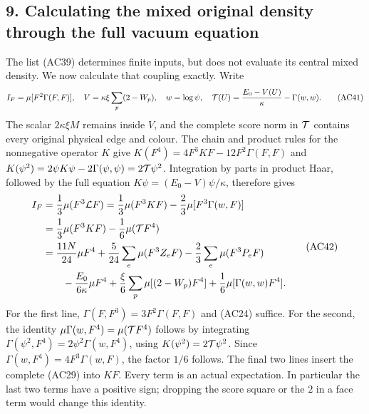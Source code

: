 \documentclass[11pt]{article}
\begin{document}
\subsection*{9. Calculating the mixed original density through the full vacuum equation}

The list (AC39) determines finite inputs, but does not evaluate its central mixed density. We now calculate that coupling exactly. Write
\[
 I_F=\mu[F^2\Gamma(F,F)],\quad
 V=\kappa\xi\sum_p(2-W_p),\quad
 w=\log\psi,\quad
 {\cal T}(U)=\frac{E_0-V(U)}{\kappa}-\Gamma(w,w).
 \tag{AC41}
\]
The scalar \(2\kappa\xi M\) remains inside \(V\), and the complete score norm in \({\cal T}\) contains every original physical edge and colour. The chain and product rules for the nonnegative operator \(K\) give
\(K(F^4)=4F^3KF-12F^2\Gamma(F,F)\) and
\(K(\psi^2)=2\psi K\psi-2\Gamma(\psi,\psi)=2{\cal T}\psi^2\).
Integration by parts in product Haar, followed by the full equation \(K\psi=(E_0-V)\psi/\kappa\), therefore gives
\[
 \begin{aligned}
 I_F
 &=\frac13\mu(F^3{\cal L}F)
  =\frac13\mu(F^3KF)-\frac23\mu[F^3\Gamma(w,F)]\\
 &=\frac13\mu(F^3KF)-\frac16\mu({\cal T}F^4)\\
 &=\frac{11N}{24}\mu F^4
     +\frac5{24}\sum_e\mu(F^3Z_eF)
     -\frac23\sum_e\mu(F^3P_eF)\\
 &\hspace{7mm}
     -\frac{E_0}{6\kappa}\mu F^4
     +\frac{\xi}{6}\sum_p\mu[(2-W_p)F^4]
     +\frac16\mu[\Gamma(w,w)F^4].
 \end{aligned}\tag{AC42}
\]
For the first line, \(\Gamma(F,F^3)=3F^2\Gamma(F,F)\) and (AC24) suffice. For the second, the identity
\(\mu\Gamma(w,F^4)=\mu({\cal T}F^4)\)
follows by integrating \(\Gamma(\psi^2,F^4)=2\psi^2\Gamma(w,F^4)\), using \(K(\psi^2)=2{\cal T}\psi^2\). Since \(\Gamma(w,F^4)=4F^3\Gamma(w,F)\), the factor \(1/6\) follows. The final two lines insert the complete (AC29) into \(KF\). Every term is an actual expectation. In particular the last two terms have a positive sign; dropping the score square or the \(2\) in a face term would change this identity.
\end{document}
